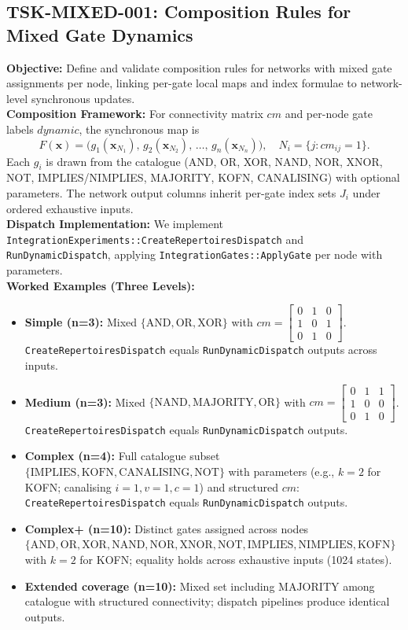 \documentclass{article}
\begin{document}
\subsection{TSK-MIXED-001: Composition Rules for Mixed Gate Dynamics}
\textbf{Objective:} Define and validate composition rules for networks with mixed gate assignments per node, linking per-gate local maps and index formulae to network-level synchronous updates.\\
\textbf{Composition Framework:} For connectivity matrix \(cm\) and per-node gate labels \(dynamic\), the synchronous map is
\[
F(\mathbf{x}) = \big(g_1(\mathbf{x}_{N_1}),\, g_2(\mathbf{x}_{N_2}),\,\dots,\, g_n(\mathbf{x}_{N_n})\big),\quad N_i=\{j: cm_{ij}=1\}.
\]
Each \(g_i\) is drawn from the catalogue (AND, OR, XOR, NAND, NOR, XNOR, NOT, IMPLIES/NIMPLIES, MAJORITY, KOFN, CANALISING) with optional parameters. The network output columns inherit per-gate index sets \(J_i\) under ordered exhaustive inputs.\\
\textbf{Dispatch Implementation:} We implement \texttt{Integration\textasciigrave Experiments::CreateRepertoiresDispatch} and \texttt{RunDynamicDispatch}, applying \texttt{Integration\textasciigrave Gates::ApplyGate} per node with parameters.\\
\textbf{Worked Examples (Three Levels):}
\begin{itemize}
\item \textbf{Simple (n=3):} Mixed \(\{\mathrm{AND}, \mathrm{OR}, \mathrm{XOR}\}\) with \(cm = \begin{bmatrix}0&1&0\\1&0&1\\0&1&0\end{bmatrix}\). \texttt{CreateRepertoiresDispatch} equals \texttt{RunDynamicDispatch} outputs across inputs.
\item \textbf{Medium (n=3):} Mixed \(\{\mathrm{NAND}, \mathrm{MAJORITY}, \mathrm{OR}\}\) with \(cm = \begin{bmatrix}0&1&1\\1&0&0\\0&1&0\end{bmatrix}\). \texttt{CreateRepertoiresDispatch} equals \texttt{RunDynamicDispatch} outputs.
\item \textbf{Complex (n=4):} Full catalogue subset \(\{\mathrm{IMPLIES}, \mathrm{KOFN}, \mathrm{CANALISING}, \mathrm{NOT}\}\) with parameters (e.g., \(k=2\) for KOFN; canalising \(i=1, v=1, c=1\)) and structured \(cm\): \texttt{CreateRepertoiresDispatch} equals \texttt{RunDynamicDispatch} outputs.
\item \textbf{Complex+ (n=10):} Distinct gates assigned across nodes \(\{\mathrm{AND}, \mathrm{OR}, \mathrm{XOR}, \mathrm{NAND}, \mathrm{NOR}, \mathrm{XNOR}, \mathrm{NOT}, \mathrm{IMPLIES}, \mathrm{NIMPLIES}, \mathrm{KOFN}\}\) with \(k=2\) for KOFN; equality holds across exhaustive inputs (1024 states).
\item \textbf{Extended coverage (n=10):} Mixed set including \(\mathrm{MAJORITY}\) among catalogue with structured connectivity; dispatch pipelines produce identical outputs.
\end{itemize}
\end{document}

